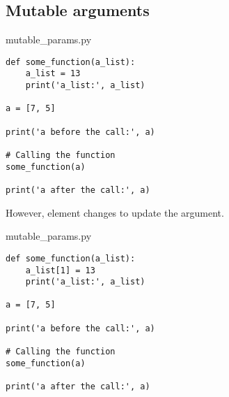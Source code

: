 \documentclass[aspectratio=1610,slidestop]{beamer}
\begin{document}
\subsection{Mutable arguments}
\begin{pframe}
 \begin{minipage}[t]{0.50\textwidth}
  \begin{pythonfile}{mutable\_params.py}
   \begin{verbatim}
def some_function(a_list):
    a_list = 13
    print('a_list:', a_list)

a = [7, 5]

print('a before the call:', a)

# Calling the function
some_function(a)

print('a after the call:', a)
   \end{verbatim}
  \end{pythonfile}
 \end{minipage}\qquad
 \pause
 \begin{minipage}[t]{0.45\textwidth}
 \vspace{-5.65cm}
 \begin{terminal}
  \end{terminal}
 \end{minipage}
\end{pframe}


\begin{pframe}
 However, element changes to update the argument.
 \medskip

 \begin{minipage}[t]{0.50\textwidth}
  \begin{pythonfile}{mutable\_params.py}
   \begin{verbatim}
def some_function(a_list):
    a_list[1] = 13
    print('a_list:', a_list)

a = [7, 5]

print('a before the call:', a)

# Calling the function
some_function(a)

print('a after the call:', a)
   \end{verbatim}
  \end{pythonfile}
 \end{minipage}\qquad
 \pause
 \begin{minipage}[t]{0.45\textwidth}
 \vspace{-5.65cm}
 \begin{terminal}
  \end{terminal}
 \end{minipage}
\end{pframe}
\end{document}
